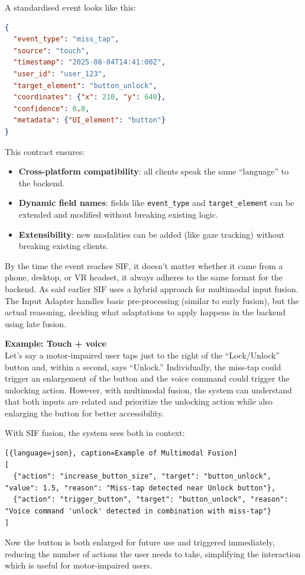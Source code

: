 \documentclass[openany]{book}
\begin{document}
A standardised event looks like this:
\begin{lstlisting}[language=json, caption={Standardised Event Example}]
{
  "event_type": "miss_tap",
  "source": "touch",
  "timestamp": "2025-08-04T14:41:00Z",
  "user_id": "user_123",
  "target_element": "button_unlock",
  "coordinates": {"x": 210, "y": 640},
  "confidence": 0.8,
  "metadata": {"UI_element": "button"}
}
\end{lstlisting}
This contract ensures:
\begin{itemize}
    \item \textbf{Cross-platform compatibility}: all clients speak the same “language” to the backend.
    \item \textbf{Dynamic field names}: fields like \texttt{event\_type} and \texttt{target\_element} can be extended and modified without breaking existing logic.
    \item \textbf{Extensibility}: new modalities can be added (like gaze tracking) without breaking existing clients.
\end{itemize}
By the time the event reaches SIF, it doesn’t matter whether it came from a phone, desktop, or VR headset, it always adheres to the same format for the backend.
As said earlier SIF uses a hybrid approach for multimodal input fusion. The Input Adapter handles basic pre-processing (similar to early fusion), but the actual reasoning, deciding what adaptations to apply happens in the backend using late fusion.

\textbf{Example: Touch + voice} \\
Let’s say a motor-impaired user taps just to the right of the “Lock/Unlock” button and, within a second, says “Unlock.”
Individually, the miss-tap could trigger an enlargement of the button and the voice command could trigger the unlocking action. However, with multimodal fusion, the system can understand that both inputs are related and prioritize the unlocking action while also enlarging the button for better accessibility.

With SIF fusion, the system sees both in context:

\begin{lstlisting}[{language=json}, caption=Example of Multimodal Fusion]
[
  {"action": "increase_button_size", "target": "button_unlock", "value": 1.5, "reason": "Miss-tap detected near Unlock button"},
  {"action": "trigger_button", "target": "button_unlock", "reason": "Voice command 'unlock' detected in combination with miss-tap"}
]
\end{lstlisting}
Now the button is both enlarged for future use and triggered immediately, reducing the number of actions the user needs to take, simplifying the interaction which is useful for motor-impaired users.
\end{document}
